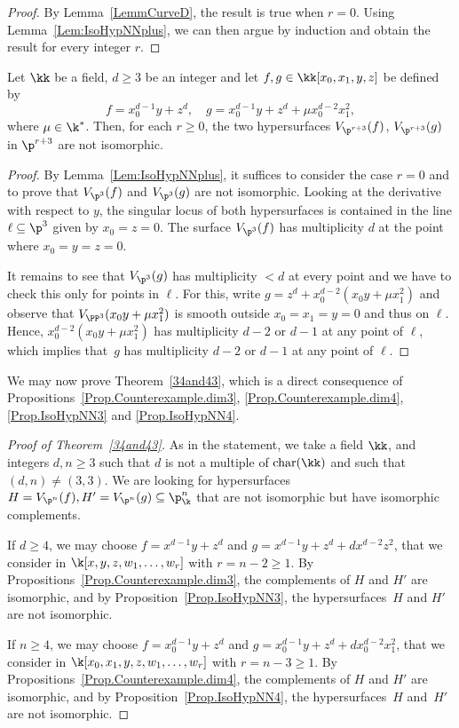 \begin{proof}
By Lemma~\ref{LemmCurveD}, the result is true when $r=0$. Using Lemma~\ref{Lem:IsoHypNNplus}, we can then argue by induction and obtain the result for every integer $r$.
\end{proof}

\begin{proposition}
\label{Prop.IsoHypNN4}
Let $\kk$ be a field, $d \geq 3$ be an integer and let $f,g\in\kk[x_0,x_1,y,z]$ be defined by
\[
f=x_0^{d-1}y+z^{d}, \quad g=x_0^{d-1}y+z^{d}+\mu x_0^{d-2}x_1^2,
\] where $\mu\in \k^*$. Then, for each $r\ge 0$, the two hypersurfaces $V_{\p^{r+3}}(f)$, $V_{\p^{r+3}}(g)$ in $\p^{r+3}$ are not isomorphic.
\end{proposition}

\begin{proof}
By Lemma~\ref{Lem:IsoHypNNplus}, it suffices to consider the case $r=0$ and to prove that $V_{\p^{3}}(f)$ and $V_{\p^{3}}(g)$ are not isomorphic. Looking at the derivative with respect to $y$, the singular locus of both hypersurfaces is contained in the line $\ell\subseteq \p^3$
given by $x_0 = z = 0$.
The surface $V_{\p^{3}}(f)$ has multiplicity $d$ at the point where $x_0=y=z=0$.

It remains to see that $V_{\p^{3}}(g)$ has multiplicity $< d$ at every point
and we have to check this only for points in $\ell$.
For this, write $g=z^d+ x_0^{d-2}(x_0y+\mu x_1^2)$ and observe that $V_{\PP^3}(x_0y+\mu x_1^2)$ is smooth outside $x_0=x_1=y=0$ and thus on $\ell$.
Hence, $x_0^{d-2}(x_0y+\mu x_1^2)$ has multiplicity $d-2$ or $d-1$ at any point of $\ell$, which implies that~$g$ has multiplicity $d-2$ or $d-1$ at any point of $\ell$.
\end{proof}

We may now prove Theorem~\ref{34and43}, which is a direct consequence of Propositions~\ref{Prop.Counterexample.dim3}, \ref{Prop.Counterexample.dim4}, \ref{Prop.IsoHypNN3} and \ref{Prop.IsoHypNN4}.

\begin{proof}[Proof of Theorem~\ref{34and43}]
As in the statement, we take a field $\kk$, and integers $d,n\ge 3$ such that $d$ is not a multiple of $\mathrm{char}(\kk)$ and such that $(d,n)\neq (3,3)$. We are looking for hypersurfaces $H=V_{\p^n}(f),H'=V_{\p^n}(g)\subseteq \p^n_\k$ that are not isomorphic but have isomorphic complements.

If $d\ge 4$, we may choose $f=x^{d-1}y+z^{d}$ and $g=x^{d-1}y+z^{d}+dx^{d-2}z^2$, that we
consider in $\k[x,y,z,w_1,\ldots,w_r]$ with $r=n-2\ge 1$. By Propositions~\ref{Prop.Counterexample.dim3}, the complements of $H$ and $H'$ are isomorphic, and by Proposition~\ref{Prop.IsoHypNN3}, the hypersurfaces~$H$ and $H'$ are not isomorphic.

If $n\ge 4$, we may choose $f=x_0^{d-1}y+z^{d}$ and $g=x_0^{d-1}y+z^{d}+dx_0^{d-2}x_1^2$, that we consider in
$\k[x_0,x_1,y,z,w_1,\ldots,w_r]$ with $r=n-3\ge 1$. By Propositions~\ref{Prop.Counterexample.dim4}, the complements of $H$ and $H'$ are isomorphic, and by Proposition~\ref{Prop.IsoHypNN4}, the hypersurfaces~$H$ and~$H'$ are not isomorphic.
\end{proof}

